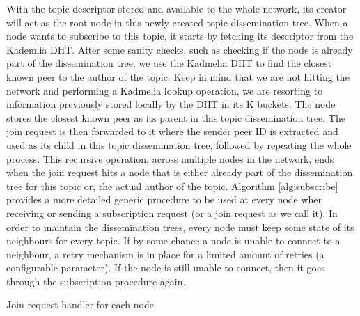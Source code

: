 With the topic descriptor stored and available to the whole network, its
creator will act as the root node in this newly created topic dissemination
tree. When a node wants to subscribe to this topic, it starts by fetching its
descriptor from the Kademlia DHT. After some sanity checks, such as checking if
the node is already part of the dissemination tree, we use the Kadmelia DHT to
find the closest known peer to the author of the topic. Keep in mind that we
are not hitting the network and performing a Kadmelia lookup operation, we are
resorting to information previously stored locally by the DHT in its K buckets.
The node stores the closest known peer as its parent in this topic
dissemination tree. The join request is then forwarded to it where the sender
peer ID is extracted and used as its child in this topic dissemination tree,
followed by repeating the whole process. This recursive operation, across
multiple nodes in the network, ends when the join request hits a node that is
either already part of the dissemination tree for this topic or, the actual
author of the topic. Algorithm \ref{alg:subscribe} provides a more detailed
generic procedure to be used at every node when receiving or sending a
subscription request (or a join request as we call it).  In order to
maintain the dissemination trees, every node must keep some state of its
neighbours for every topic. If by some chance a node is unable to connect to a
neighbour, a retry mechanism is in place for a limited amount of retries (a
configurable parameter). If the node is still unable to connect, then it goes
through the subscription procedure again.

\begin{algorithm}
  \SetAlgoLined
  \caption{Join request handler for each node}
    \label{alg:subscribe}
\end{algorithm}

